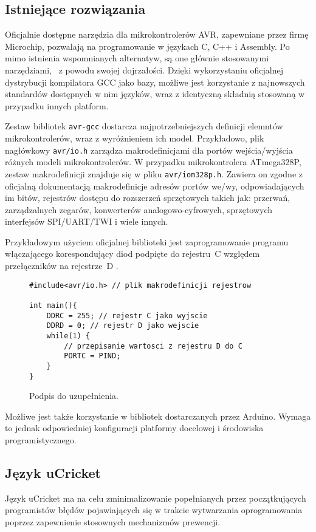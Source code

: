 \subsection{Istniejące rozwiązania}
Oficjalnie dostępne narzędzia dla mikrokontrolerów AVR, zapewniane przez firmę Microchip, pozwalają na programowanie w językach C, C++ i Assembly. Po mimo istnienia wspomnianych alternatyw, są one głównie stosowanymi narzędziami, \nocomma\ z powodu swojej dojrzałości.
Dzięki wykorzystaniu oficjalnej dystrybucji kompilatora GCC jako bazy, możliwe jest korzystanie z najnowszych standardów dostępnych w nim języków, wraz z identyczną składnią stosowaną w przypadku innych platform.

Zestaw bibliotek \lstinline|avr-gcc| dostarcza najpotrzebniejszych definicji elemntów mikrokontrolerów, wraz z wyróżnieniem ich model. Przykładowo, plik nagłówkowy \lstinline|avr/io.h| zarządza makrodefinicjami dla portów wejścia/wyjścia różnych modeli mikrokontrolerów. W przypadku mikrokontrolera ATmega328P, zestaw makrodefinicji znajduje się w pliku \lstinline|avr/iom328p.h|. Zawiera on zgodne z oficjalną dokumentacją makrodefinicje adresów portów we/wy, odpowiadających im bitów, rejestrów dostępu do rozszerzeń sprzętowych takich jak: przerwań, zarządzalnych zegarów, konwerterów analogowo-cyfrowych, sprzętowych interfejsów SPI/UART/TWI i wiele innych.

 Przykładowym użyciem oficjalnej biblioteki jest zaprogramowanie programu włączającego korespondujący diod podpięte do rejestru~C względem przełączników na rejestrze~D .
\begin{figure}
\centering
\begin{lstlisting}
#include<avr/io.h> // plik makrodefinicji rejestrow

int main(){
	DDRC = 255; // rejestr C jako wyjscie
	DDRD = 0; // rejestr D jako wejscie
	while(1) {
		// przepisanie wartosci z rejestru D do C
		PORTC = PIND;
	}
}
\end{lstlisting}
\caption{Podpis do uzupełnienia.}
\label{fig:lst:1}
\end{figure}

Możliwe jest także korzystanie w bibliotek dostarczanych przez Arduino. Wymaga to jednak odpowiedniej konfiguracji platformy docelowej i środowiska programistycznego.

\subsection{Język uCricket}
Język uCricket ma na celu zminimalizowanie popełnianych przez początkujących programistów błędów pojawiających się w trakcie wytwarzania oprogramowania poprzez zapewnienie stosownych mechanizmów prewencji. 
